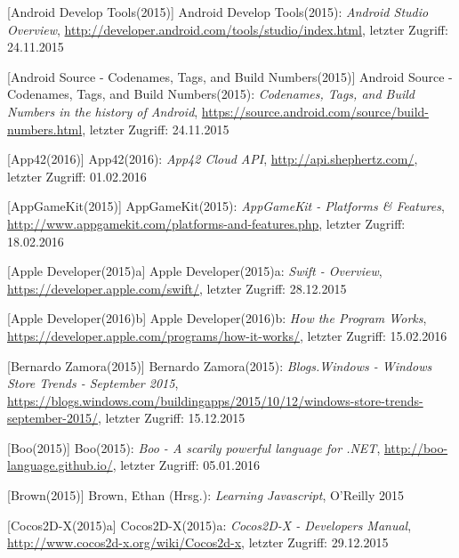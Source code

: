 \begin{thebibliography}{}

[Android Develop Tools(2015)] Android Develop Tools(2015): \emph{Android Studio Overview},
\url{http://developer.android.com/tools/studio/index.html}, letzter Zugriff: 24.11.2015

[Android Source - Codenames, Tags, and Build Numbers(2015)] Android Source - Codenames, Tags, and Build Numbers(2015):
\emph{Codenames, Tags, and Build Numbers in the history of Android},
\url{https://source.android.com/source/build-numbers.html}, letzter Zugriff: 24.11.2015

[App42(2016)] App42(2016): \emph{App42 Cloud API},
\url{http://api.shephertz.com/}, letzter Zugriff: 01.02.2016

[AppGameKit(2015)] AppGameKit(2015): \emph{AppGameKit - Platforms \& Features},
\url{http://www.appgamekit.com/platforms-and-features.php}, letzter Zugriff: 18.02.2016

[Apple Developer(2015)a] Apple Developer(2015)a: \emph{Swift - Overview},
\url{https://developer.apple.com/swift/}, letzter Zugriff: 28.12.2015

[Apple Developer(2016)b] Apple Developer(2016)b: \emph{How the Program Works},
\url{https://developer.apple.com/programs/how-it-works/}, letzter Zugriff: 15.02.2016

[Bernardo Zamora(2015)] Bernardo Zamora(2015): \emph{Blogs.Windows - Windows Store Trends - September 2015},
\url{https://blogs.windows.com/buildingapps/2015/10/12/windows-store-trends-september-2015/}, letzter Zugriff: 15.12.2015

[Boo(2015)] Boo(2015): \emph{Boo - A scarily powerful language for .NET},
\url{http://boo-language.github.io/}, letzter Zugriff: 05.01.2016

[Brown(2015)] Brown, Ethan (Hrsg.): 
\emph{Learning Javascript}, O'Reilly 2015

[Cocos2D-X(2015)a] Cocos2D-X(2015)a: \emph{Cocos2D-X - Developers Manual},
\url{http://www.cocos2d-x.org/wiki/Cocos2d-x}, letzter Zugriff: 29.12.2015


\end{thebibliography}
